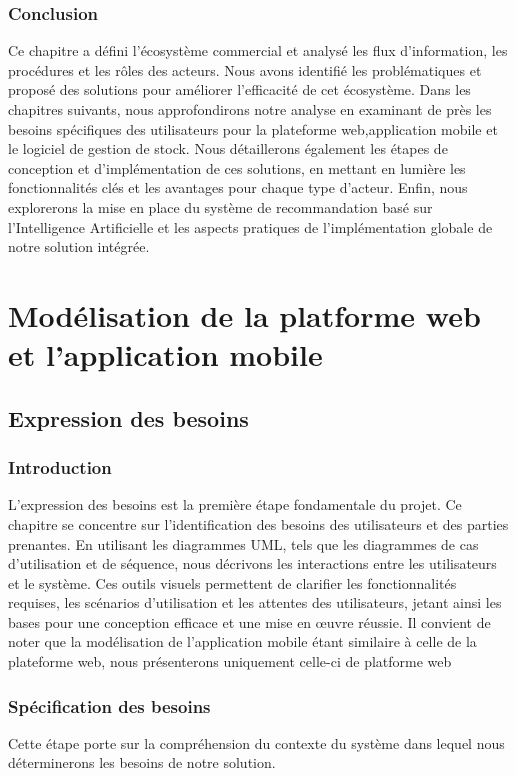 \documentclass[edit,12pt,a4paper,ChapStyle,oneside,doubleinterligne]{report}
\begin{document}
\section{Conclusion}
Ce chapitre a défini l'écosystème commercial et analysé les flux d'information, les procédures et les rôles des acteurs. Nous avons identifié les problématiques et proposé des solutions pour améliorer l'efficacité de cet écosystème. Dans les chapitres suivants, nous approfondirons notre analyse en examinant de près les besoins spécifiques des utilisateurs pour la plateforme web,application mobile et le logiciel de gestion de stock. Nous détaillerons également les étapes de conception et d'implémentation de ces solutions, en mettant en lumière les fonctionnalités clés et les avantages pour chaque type d'acteur. Enfin, nous explorerons la mise en place du système de recommandation basé sur l'Intelligence Artificielle et les aspects pratiques de l'implémentation globale de notre solution intégrée.




\part{Modélisation de la platforme web et l'application mobile}
\chapter{Expression des besoins}  
\newpage
\section{Introduction }
L'expression des besoins est la première étape fondamentale du projet. Ce chapitre se concentre sur l'identification des besoins des utilisateurs et des parties prenantes. En utilisant les diagrammes UML, tels que les diagrammes de cas d'utilisation et de séquence, nous décrivons les interactions entre les utilisateurs et le système. Ces outils visuels permettent de clarifier les fonctionnalités requises, les scénarios d'utilisation et les attentes des utilisateurs, jetant ainsi les bases pour une conception efficace et une mise en œuvre réussie. Il convient de noter que la modélisation de l'application mobile étant similaire à celle de la plateforme web, nous présenterons uniquement celle-ci de platforme web
\section{Spécification des besoins}
Cette étape porte sur la compréhension du contexte du système dans lequel nous déterminerons les besoins de notre solution.
\end{document}
